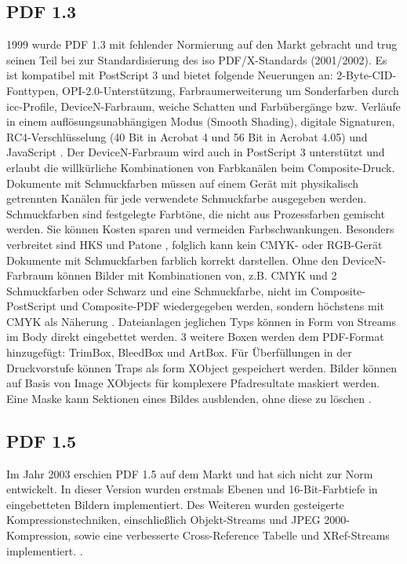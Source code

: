 \subsection{PDF 1.3}
1999 wurde PDF 1.3 mit fehlender Normierung auf den Markt gebracht und trug seinen Teil bei zur Standardisierung des \gls{iso} PDF/X-Standards (2001/2002). Es ist kompatibel mit PostScript 3 und bietet folgende Neuerungen an: 2-Byte-CID-Fonttypen, OPI-2.0-Unterstützung, Farbraumerweiterung um Sonderfarben durch \gls{icc}-Profile, DeviceN-Farbraum, weiche Schatten und Farbübergänge bzw. Verläufe in einem auflösungsunabhängigen Modus (Smooth Shading), digitale Signaturen, RC4-Verschlüsselung (40 Bit in Acrobat 4 und 56 Bit in Acrobat 4.05) und JavaScript \cite{proj-consult, schneeberger}. Der DeviceN-Farbraum wird auch in PostScript 3 unterstützt und erlaubt die willkürliche Kombinationen von Farbkanälen beim Composite-Druck. Dokumente mit Schmuckfarben müssen auf einem Gerät mit physikalisch getrennten Kanälen für jede verwendete Schmuckfarbe ausgegeben werden. Schmuckfarben sind festgelegte Farbtöne, die nicht aus Prozessfarben gemischt werden. Sie können Kosten sparen und vermeiden Farbschwankungen. Besonders verbreitet sind HKS und Patone \cite{kompendium}, folglich kann kein CMYK- oder RGB-Gerät Dokumente mit Schmuckfarben farblich korrekt darstellen. Ohne den DeviceN-Farbraum können Bilder mit Kombinationen von, z.B. CMYK und 2 Schmuckfarben oder Schwarz und eine Schmuckfarbe, nicht im Composite-PostScript und Composite-PDF wiedergegeben werden, sondern höchstens mit CMYK als Näherung \cite{helios}. Dateianlagen jeglichen Typs können in Form von Streams im Body direkt eingebettet werden. 3 weitere Boxen werden dem PDF-Format hinzugefügt: TrimBox, BleedBox und ArtBox. Für Überfüllungen in der Druckvorstufe können Traps als form XObject gespeichert werden. Bilder können auf Basis von Image XObjects für komplexere Pfadresultate maskiert werden. Eine Maske kann Sektionen eines Bildes ausblenden, ohne diese zu löschen \cite{schneeberger}.

\subsection{PDF 1.5}
Im Jahr 2003 erschien PDF 1.5 auf dem Markt und hat sich nicht zur Norm entwickelt. In dieser Version wurden erstmals Ebenen und 16-Bit-Farbtiefe in eingebetteten Bildern implementiert. Des Weiteren wurden gesteigerte Kompressionstechniken, einschließlich Objekt-Streams und JPEG 2000-Kompression, sowie eine verbesserte Cross-Reference Tabelle und XRef-Streams implementiert. \cite{proj-consult, schneeberger}. 

